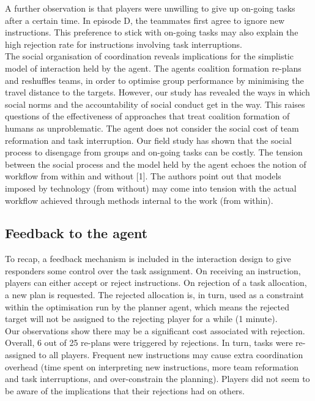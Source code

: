 A further observation is that players were unwilling to give up on-going tasks after a certain time. In episode D, the teammates first agree to ignore new instructions. This preference to stick with on-going tasks may also explain the high rejection rate for instructions involving task interruptions. \\

The social organisation of coordination reveals implications for the simplistic model of interaction held by the agent. The agents coalition formation re-plans and reshuffles teams, in order to optimise group performance by minimising the travel distance to the targets. However, our study has revealed the ways in which social norms and the accountability of social conduct get in the way. This raises questions of the effectiveness of approaches that treat coalition formation of humans as unproblematic. The agent does not consider the social cost of team reformation and task interruption. Our field study has shown that the social process to disengage from groups and on-going tasks can be costly. The tension between the social process and the model held by the agent echoes the notion of workflow from within and without [1]. The authors point out that models imposed by technology (from without) may come into tension with the actual workflow achieved through methods internal to the work (from within). 

\subsection{Feedback to the agent}\label{sec:studytwofeedback}

To recap, a feedback mechanism is included in the interaction design to give responders some control over the task assignment. On receiving an instruction, players can either accept or reject instructions. On rejection of a task allocation, a new plan is requested. The rejected allocation is, in turn, used as a constraint within the optimisation run by the planner agent, which means the rejected target will not be assigned to the rejecting player for a while (1 minute). \\

Our observations show there may be a significant cost associated with rejection. Overall, 6 out of 25 re-plans were triggered by rejections. In turn, tasks were re-assigned to all players. Frequent new instructions may cause extra coordination overhead (time spent on interpreting new instructions, more team reformation and task interruptions, and over-constrain the planning). Players did not seem to be aware of the implications that their rejections had on others.\\
 
